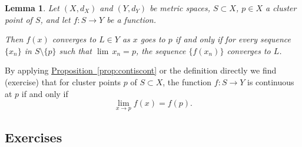 \documentclass[12pt,openany]{book}
\theoremstyle{plain}
\newtheorem{lemma}[thm]{Lemma}
\theoremstyle{remark}
\theoremstyle{definition}
\theoremstyle{exercise}
\theoremstyle{example}
\newcommand{\propref}[1]{\hyperref[#1]{Proposition~\ref*{#1}}}
\begin{document}
\begin{lemma}\label{ms:seqflimit:lemma}
Let $(X,d_X)$ and $(Y,d_Y)$ be metric spaces, $S \subset X$, $p \in X$
a cluster point of $S$, and let $f \colon S \to Y$ be a function.

Then
$f(x)$ converges to $L \in Y$ as $x$ goes to $p$ if and only if for every sequence $\{ x_n \}$
in $S \setminus \{p\}$
such that $\lim\, x_n = p$,
the sequence $\{ f(x_n) \}$ converges to $L$.
\end{lemma}

By applying \propref{prop:contiscont} or the definition directly we find
(exercise) that for cluster points $p$ of $S
\subset X$, the function
$f \colon S \to Y$ is continuous at $p$ if and only if
\begin{equation*}
\lim_{x \to p} f(x) = f(p) .
\end{equation*}

\subsection{Exercises}
\end{document}
